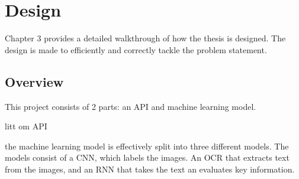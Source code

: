\chapter{Design}
\label{ch:design}
Chapter 3 provides a detailed walkthrough of how the thesis is designed.
The design is made to efficiently and correctly tackle the problem statement.


\section{Overview}\label{sec:Overview}

This project consists of 2 parts: an API and machine learning model.

litt om API

the machine learning model is effectively split into three different models.
The models consist of a CNN, which labels the images.
An OCR that extracts text from the images, and an RNN that takes the text an evaluates key information.


